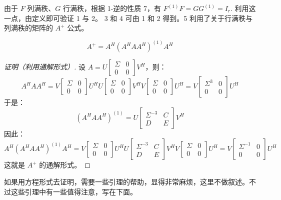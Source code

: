 \begin{remark}
由于 $F$ 列满秩、$G$ 行满秩，根据 1-逆的性质 7，有 $F^{(1)}F=GG^{(1)}=I_r$.  利用这一点，由定义即可验证 1 与 2。
3 和 4 可由 1 和 2 得到。5 利用了关于行满秩与列满秩的矩阵的 $A^+$ 公式。
\end{remark}

\begin{theorem}
\[
    A^+=A^H(A^HAA^H)^{(1)}A^H
\]
\end{theorem}
\begin{proof}[证明（利用通解形式）]
设 $A=U\begin{bmatrix}\Sigma&0\\0&0\end{bmatrix}V^H$，则：
\[
    A^HAA^H=V\begin{bmatrix}\Sigma&0\\0&0\end{bmatrix}U^HU\begin{bmatrix}\Sigma&0\\0&0\end{bmatrix}V^HV\begin{bmatrix}\Sigma&0\\0&0\end{bmatrix}U^H=V\begin{bmatrix}\Sigma^3&0\\0&0\end{bmatrix}U^H
\]
于是：
\[
    (A^HAA^H)^{(1)}=U\begin{bmatrix}\Sigma^{-3}&C\\D&E\end{bmatrix}V^H
\]
因此：
\[
    A^H(A^HAA^H)^{(1)}A^H=V\begin{bmatrix}\Sigma&0\\0&0\end{bmatrix}U^HU\begin{bmatrix}\Sigma^{-3}&C\\D&E\end{bmatrix}V^HV\begin{bmatrix}\Sigma&0\\0&0\end{bmatrix}U^H=V\begin{bmatrix}\Sigma^{-1}&0\\0&0\end{bmatrix}U^H
\]
这就是 $A^+$ 的通解形式。
\end{proof}

如果用方程形式去证明，需要一些引理的帮助，显得非常麻烦，这里不做叙述。不过这些引理中有一些值得注意，写在下面。

